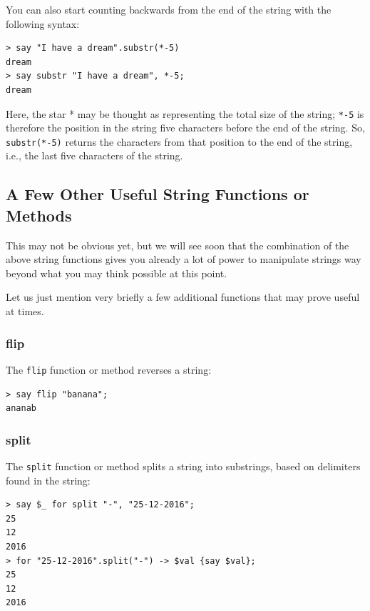 You can also start counting backwards from the end of the 
string with the following syntax:

\begin{verbatim}
> say "I have a dream".substr(*-5)
dream
> say substr "I have a dream", *-5;
dream
\end{verbatim}
%
Here, the star * may be thought as representing the total size 
of the string; \verb'*-5' is therefore the position in the string 
five characters before the end of the string. So, \verb'substr(*-5)' 
returns the characters from that position to the end of the string, 
i.e., the last five characters of the string.


\subsection{A Few Other Useful String Functions or Methods}

This may not be obvious yet, but we will see soon 
that the combination of the above string functions gives you 
already a lot of power to manipulate strings way beyond what 
you may think possible at this point.

Let us just mention very briefly a few additional functions 
that may prove useful at times.

\subsubsection{flip}

The {\tt flip} function or method reverses a string:

\begin{verbatim}
> say flip "banana";
ananab
\end{verbatim}
%

\subsubsection{split}
The {\tt split} function or method splits a string 
into substrings, based on delimiters found in the string:

\begin{verbatim}
> say $_ for split "-", "25-12-2016";
25
12
2016
> for "25-12-2016".split("-") -> $val {say $val};
25
12
2016
\end{verbatim}

